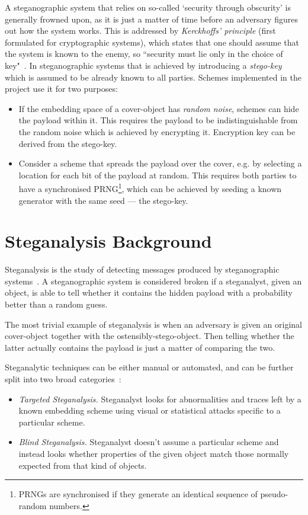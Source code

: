 \documentclass[12pt,british,twoside,notitlepage,usenames,dvipsnames,hypens,final]{report}
\numberwithin{equation}{section}
\numberwithin{figure}{section}
\begin{document}
A steganographic system that relies on so-called `security through obscurity' is generally frowned upon, as it is just a matter of time before an adversary figures out how the system works. This is addressed by \emph{Kerckhoffs' principle} (first formulated for cryptographic systems), which states that one should assume that the system is known to the enemy, so ``security must lie only in the choice of key"~\cite{infohiding-survey}. In steganographic systems that is achieved by introducing a \emph{stego-key} which is assumed to be already known to all parties. Schemes implemented in the project use it for two purposes:

\begin{itemize}
\item If the embedding space of a cover-object has \emph{random noise}, schemes can hide the payload within it. This requires the payload to be indistinguishable from the random noise which is achieved by encrypting it. Encryption key can be derived from the stego-key.

\item Consider a scheme that spreads the payload over the cover, e.g. by selecting a location for each bit of the payload at random. This requires both parties to have a synchronised PRNG\footnote{PRNGs are synchronised if they generate an identical sequence of pseudo-random numbers.}, which can be achieved by seeding a known generator with the same seed --- the stego-key.
\end{itemize}
\section{Steganalysis Background}

Steganalysis is the study of detecting messages produced by steganographic systems~\cite[p.~10]{fridrich}. A steganographic system is considered broken if a steganalyst, given an object, is able to tell whether it contains the hidden payload with a probability better than a random guess.

The most trivial example of steganalysis is when an adversary is given an original cover-object together with the ostensibly-stego-object. Then telling whether the latter actually contains the payload is just a matter of comparing the two. 

Steganalytic techniques can be either manual or automated, and can be further split into two broad categories~\cite{bateman}:
\begin{itemize}
\item \emph{Targeted Steganalysis.} Steganalyst looks for abnormalities and traces left by a known embedding scheme using visual or statistical attacks specific to a particular scheme.
\item \emph{Blind Steganalysis.} Steganalyst doesn't assume a particular scheme and instead looks whether properties of the given object match those normally expected from that kind of objects. 
\end{itemize} 
\end{document}
